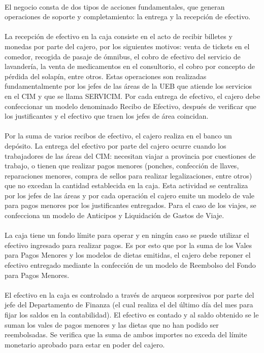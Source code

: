 \paragraph{}El negocio consta de dos tipos de acciones fundamentales, que generan operaciones de soporte y completamiento: la entrega y la recepción de efectivo. 
\paragraph{}La recepción de efectivo en la caja consiste en el acto de recibir billetes y monedas por parte del cajero, por los siguientes motivos: venta de tickets en el comedor, recogida de pasaje de ómnibus, el cobro de efectivo del servicio de lavandería, la venta de medicamentos en el consultorio, el cobro por concepto de pérdida del solapín, entre otros. Estas operaciones son realizadas fundamentalmente por los jefes de las áreas de la UEB que atiende los servicios en el CIM y que se llama SERVICIM. Por cada entrega de efectivo, el cajero debe confeccionar un modelo denominado Recibo de Efectivo, después de verificar que los justificantes y el efectivo que traen los jefes de área coincidan. 
\paragraph{}Por la suma de varios recibos de efectivo, el cajero realiza en el banco un depósito. La entrega del efectivo por parte del cajero ocurre cuando los trabajadores de las áreas del CIM: necesitan viajar a provincia por cuestiones de trabajo, o tienen que realizar pagos menores (ponches, confección de llaves, reparaciones menores, compra de sellos para realizar legalizaciones, entre otros) que no excedan la cantidad establecida en la caja. Esta actividad se centraliza por los jefes de las áreas y por cada operación el cajero emite un modelo de vale para pagos menores por los justificantes entregados. Para el caso de los viajes, se confecciona un modelo de Anticipos y Liquidación de Gastos de Viaje.
\paragraph{}La caja tiene un fondo límite para operar y en ningún caso se puede utilizar el efectivo ingresado para realizar pagos. Es por esto que por la suma de los Vales para Pagos Menores y los modelos de dietas emitidas, el cajero debe reponer el efectivo entregado mediante la confección de un modelo de Reembolso del Fondo para Pagos Menores.
\paragraph{}El efectivo en la caja es controlado a través de arqueos sorpresivos por parte del jefe del Departamento de Finanza (el cual realiza el del último día del mes para fijar los saldos en la contabilidad). El efectivo es contado y al saldo obtenido se le suman los vales de pagos menores y las dietas que no han podido ser reembolsadas. Se verifica que la suma de ambos importes no exceda del límite monetario aprobado para estar en poder del cajero.
